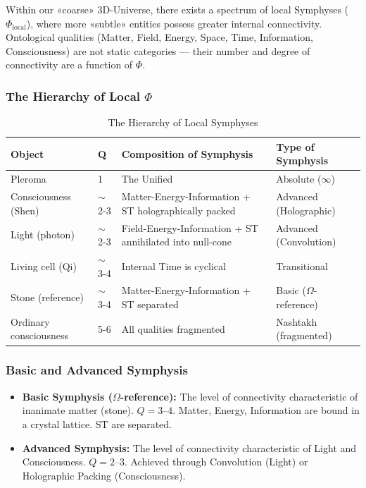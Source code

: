 \documentclass[a4paper,12pt]{article}
\begin{document}
	Within our «coarse» 3D-Universe, there exists a spectrum of local Symphyses ($\Phi_{\text{local}}$), where more «subtle» entities possess greater internal connectivity. Ontological qualities (Matter, Field, Energy, Space, Time, Information, Consciousness) are not static categories — their number and degree of connectivity are a function of $\Phi$.
	
	\subsubsection{The Hierarchy of Local $\Phi$}
	
	\begin{table}[H]
		\centering
		\begin{tabular}{|p{2.8cm}|p{2.2cm}|p{5.5cm}|p{3.5cm}|}
			\hline
			\textbf{Object} & \textbf{Q} & \textbf{Composition of Symphysis} & \textbf{Type of Symphysis} \\
			\hline
			Pleroma & 1 & The Unified & Absolute ($\infty$) \\
			\hline
			Consciousness (Shen) & $\sim$2-3 & Matter-Energy-Information + ST holographically packed & Advanced (Holographic) \\
			\hline
			Light (photon) & $\sim$2-3 & Field-Energy-Information + ST annihilated into null-cone & Advanced (Convolution) \\
			\hline
			Living cell (Qi) & $\sim$3-4 & Internal Time is cyclical & Transitional \\
			\hline
			Stone (reference) & $\sim$3-4 & Matter-Energy-Information + ST separated & Basic ($\Omega$-reference) \\
			\hline
			Ordinary consciousness & 5-6 & All qualities fragmented & Nashtakh (fragmented) \\
			\hline
		\end{tabular}
		\caption{The Hierarchy of Local Symphyses}
	\end{table}
	
	\subsubsection{Basic and Advanced Symphysis}
	
	\begin{itemize}
		\item \textbf{Basic Symphysis ($\Omega$-reference):} The level of connectivity characteristic of inanimate matter (stone). $Q = 3\text{--}4$. Matter, Energy, Information are bound in a crystal lattice. ST are separated.
		\item \textbf{Advanced Symphysis:} The level of connectivity characteristic of Light and Consciousness. $Q = 2\text{--}3$. Achieved through Convolution (Light) or Holographic Packing (Consciousness).
	\end{itemize}
	
\end{document}

